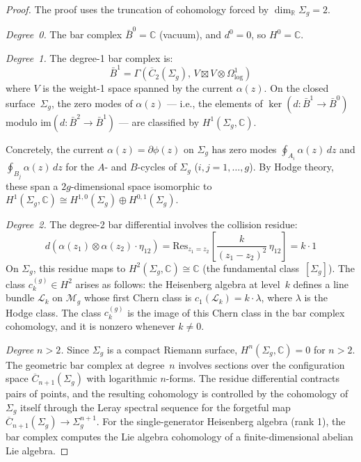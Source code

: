 \begin{proof}
The proof uses the truncation of cohomology forced by $\dim_\mathbb{R} \Sigma_g = 2$.

\emph{Degree~0.} The bar complex $\bar{B}^0 = \mathbb{C}$ (vacuum), and $d^0 = 0$, so $H^0 = \mathbb{C}$.

\emph{Degree~1.} The degree-1 bar complex is:
\[
\bar{B}^1 = \Gamma(\overline{C}_2(\Sigma_g),\, V \boxtimes V \otimes \Omega^1_{\log})
\]
where $V$ is the weight-1 space spanned by the current $\alpha(z)$.  On the closed surface~$\Sigma_g$, the zero modes of $\alpha(z)$ --- i.e., the elements of $\ker(d: \bar{B}^1 \to \bar{B}^0)$ modulo $\mathrm{im}(d: \bar{B}^2 \to \bar{B}^1)$ --- are classified by $H^1(\Sigma_g, \mathbb{C})$.

Concretely, the current $\alpha(z) = \partial\phi(z)$ on $\Sigma_g$ has zero modes $\oint_{A_i} \alpha(z)\, dz$ and $\oint_{B_j} \alpha(z)\, dz$ for the $A$- and $B$-cycles of $\Sigma_g$ ($i,j = 1, \ldots, g$).  By Hodge theory, these span a $2g$-dimensional space isomorphic to $H^1(\Sigma_g, \mathbb{C}) \cong H^{1,0}(\Sigma_g) \oplus H^{0,1}(\Sigma_g)$.

\emph{Degree~2.}  The degree-2 bar differential involves the collision residue:
\[
d(\alpha(z_1) \otimes \alpha(z_2) \cdot \eta_{12}) = \mathrm{Res}_{z_1 = z_2}\!\left[\frac{k}{(z_1-z_2)^2}\, \eta_{12}\right] = k \cdot 1
\]
On $\Sigma_g$, this residue maps to $H^2(\Sigma_g, \mathbb{C}) \cong \mathbb{C}$ (the fundamental class~$[\Sigma_g]$).  The class $c_k^{(g)} \in H^2$ arises as follows: the Heisenberg algebra at level~$k$ defines a line bundle $\mathcal{L}_k$ on $\mathcal{M}_g$ whose first Chern class is $c_1(\mathcal{L}_k) = k \cdot \lambda$, where $\lambda$ is the Hodge class.  The class $c_k^{(g)}$ is the image of this Chern class in the bar complex cohomology, and it is nonzero whenever $k \neq 0$.

\emph{Degree $n > 2$.}  Since $\Sigma_g$ is a compact Riemann surface, $H^n(\Sigma_g, \mathbb{C}) = 0$ for $n > 2$.  The geometric bar complex at degree~$n$ involves sections over the configuration space $\overline{C}_{n+1}(\Sigma_g)$ with logarithmic $n$-forms.  The residue differential contracts pairs of points, and the resulting cohomology is controlled by the cohomology of $\Sigma_g$ itself through the Leray spectral sequence for the forgetful map $\overline{C}_{n+1}(\Sigma_g) \to \Sigma_g^{n+1}$.  For the single-generator Heisenberg algebra (rank 1), the bar complex computes the Lie algebra cohomology of a finite-dimensional abelian Lie algebra.


\end{proof}
